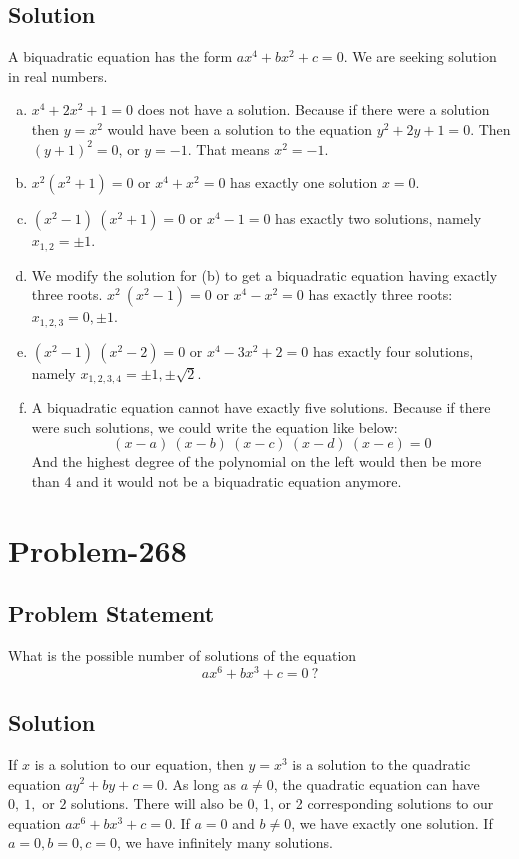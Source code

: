 \documentclass[12pt]{article}
\begin{document}
\subsection*{Solution}
A biquadratic equation has the form $ax^4+bx^2+c = 0$. We are seeking solution in real numbers.
\begin{enumerate}[(a)]
	\item $x^4+2x^2+1 = 0$ does not have a solution. Because if there were a solution then $y = x^2$ would have been a solution to the equation $y^2+2y+1 = 0$. Then $(y+1)^2 = 0$, or $y = -1$. That means $x^2 = -1$.
	\item $x^2(x^2+1) = 0$ or $x^4+x^2 = 0$ has exactly one solution $x = 0$.
	\item $\left(x^2-1\right)\ \left(x^2+1\right) = 0$ or $x^4-1 = 0$ has exactly two solutions, namely $x_{1,2} = \pm 1$.
	\item We modify the solution for (b) to get a biquadratic equation having exactly three roots. $x^2\ \left(x^2-1\right) = 0$ or $x^4-x^2 = 0$ has exactly three roots: $x_{1,2,3} = 0, \pm 1$.
	\item $\left(x^2-1\right)\ \left(x^2-2\right) = 0$ or $x^4-3x^2+2=0$ has exactly four solutions, namely $x_{1,2,3,4} = \pm 1, \pm \sqrt{2}$.
	\item A biquadratic equation cannot have exactly five solutions. Because if there were such solutions, we could write the equation like below:
	\[
		(x-a)\ (x-b)\ (x-c)\ (x-d)\ (x-e) = 0
	\]
And the highest degree of the polynomial on the left would then be more than 4 and it would not be a biquadratic equation anymore.
\end{enumerate}

\section*{Problem-268}
\subsection*{Problem Statement}
What is the possible number of solutions of the equation
\[
	ax^6 + bx^3 + c = 0\ ?
\]

\subsection*{Solution}
If $x$ is a solution to our equation, then $y = x^3$ is a solution to the quadratic equation $ay^2 + by + c = 0$. As long as $a \neq 0$, the quadratic equation can have $0,\ 1,$ or $2$ solutions. There will also be 0, 1, or 2 corresponding solutions to our equation $ax^6 + bx^3 + c = 0$. If $a = 0$ and $b \neq 0$, we have exactly one solution. If $a = 0, b = 0, c = 0$, we have infinitely many solutions.
\end{document}
